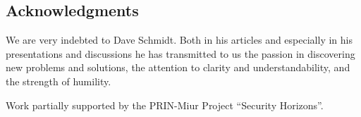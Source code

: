 \documentclass[submission,copyright,creativecommons]{eptcs}
\begin{document}
\subsection*{Acknowledgments}
We are very indebted to Dave Schmidt. Both in his articles and especially in his presentations and discussions he has transmitted to us the passion in discovering new problems and solutions, the attention to clarity and understandability, and the strength of humility.

Work partially supported by the PRIN-Miur Project \textquotedblleft Security Horizons\textquotedblright .



\end{document}
